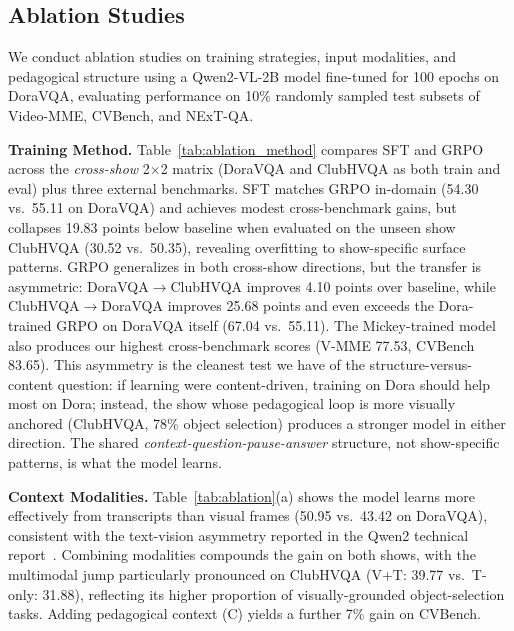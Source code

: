 \documentclass{article}
\begin{document}
\ablationtable
\subsection{Ablation Studies}
We conduct ablation studies on training strategies, input modalities, and pedagogical structure using a Qwen2-VL-2B model fine-tuned for 100 epochs on DoraVQA, evaluating performance on 10\% randomly sampled test subsets of Video-MME, CVBench, and NExT-QA.


\noindent\textbf{Training Method.} Table~\ref{tab:ablation_method} compares SFT and GRPO across the \textit{cross-show} 2$\times$2 matrix (DoraVQA and ClubHVQA as both train and eval) plus three external benchmarks. SFT matches GRPO in-domain (54.30 vs.\ 55.11 on DoraVQA) and achieves modest cross-benchmark gains, but collapses 19.83 points below baseline when evaluated on the unseen show ClubHVQA (30.52 vs.\ 50.35), revealing overfitting to show-specific surface patterns. GRPO generalizes in both cross-show directions, but the transfer is asymmetric: DoraVQA$\rightarrow$ClubHVQA improves 4.10 points over baseline, while ClubHVQA$\rightarrow$DoraVQA improves 25.68 points and even exceeds the Dora-trained GRPO on DoraVQA itself (67.04 vs.\ 55.11). The Mickey-trained model also produces our highest cross-benchmark scores (V-MME 77.53, CVBench 83.65). This asymmetry is the cleanest test we have of the structure-versus-content question: if learning were content-driven, training on Dora should help most on Dora; instead, the show whose pedagogical loop is more visually anchored (ClubHVQA, 78\% object selection) produces a stronger model in either direction. The shared \textit{context-question-pause-answer} structure, not show-specific patterns, is what the model learns.

\noindent\textbf{Context Modalities.} Table~\ref{tab:ablation}(a) shows the model learns more effectively from transcripts than visual frames (50.95 vs.\ 43.42 on DoraVQA), consistent with the text-vision asymmetry reported in the Qwen2 technical report~\cite{wang2024qwen2vl}. Combining modalities compounds the gain on both shows, with the multimodal jump particularly pronounced on ClubHVQA (V+T: 39.77 vs.\ T-only: 31.88), reflecting its higher proportion of visually-grounded object-selection tasks. Adding pedagogical context (C) yields a further 7\% gain on CVBench.
\pausehinttable
\end{document}

